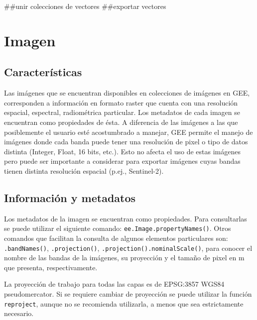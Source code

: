 \documentclass[
]{article}
\begin{document}
\#\#unir colecciones de vectores \#\#exportar vectores

\newpage

\hypertarget{imagen}{%
\section{Imagen}\label{imagen}}

\hypertarget{caracteruxedsticas}{%
\subsection{Características}\label{caracteruxedsticas}}

Las imágenes que se encuentran disponibles en colecciones de imágenes en
GEE, corresponden a información en formato raster que cuenta con una
resolución espacial, espectral, radiométrica particular. Los metadatos
de cada imagen se encuentran como propiedades de ésta. A diferencia de
las imágenes a las que posiblemente el usuario esté acostumbrado a
manejar, GEE permite el manejo de imágenes donde cada banda puede tener
una resolución de pixel o tipo de datos distinta (Integer, Float, 16
bits, etc.). Esto no afecta el uso de estas imágenes pero puede ser
importante a considerar para exportar imágenes cuyas bandas tienen
distinta resolución espacial (p.ej., Sentinel-2).

\hypertarget{informaciuxf3n-y-metadatos}{%
\subsection{Información y metadatos}\label{informaciuxf3n-y-metadatos}}

Los metadatos de la imagen se encuentran como propiedades. Para
consultarlas se puede utilizar el siguiente comando:
\texttt{ee.Image.propertyNames()}. Otros comandos que facilitan la
consulta de algunos elementos particulares son: \texttt{.bandNames()},
\texttt{.projection()}, \texttt{.projection().nominalScale()}, para
conocer el nombre de las bandas de la imágenes, su proyección y el
tamaño de pixel en m que presenta, respectivamente.

\begin{tipblock}
La proyección de trabajo para todas las capas es de EPSG:3857 WGS84
pseudomercator. Si se requiere cambiar de proyección se puede utilizar
la función \texttt{reproject}, aunque no se recomienda utilizarla, a
menos que sea estrictamente necesario.

\end{tipblock}
\end{document}
